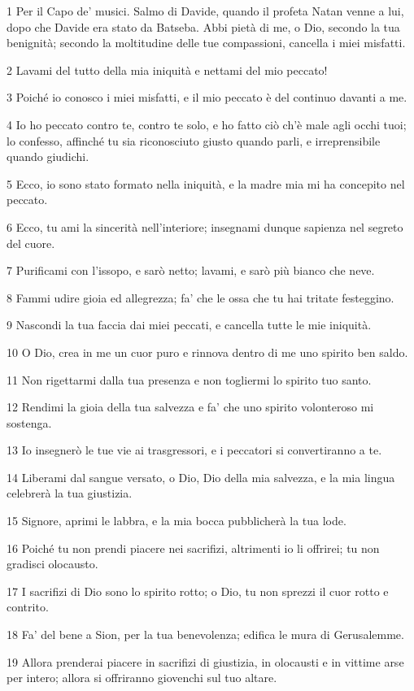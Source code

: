 \par 1 Per il Capo de' musici. Salmo di Davide, quando il profeta Natan venne a lui, dopo che Davide era stato da Batseba. Abbi pietà di me, o Dio, secondo la tua benignità; secondo la moltitudine delle tue compassioni, cancella i miei misfatti.
\par 2 Lavami del tutto della mia iniquità e nettami del mio peccato!
\par 3 Poiché io conosco i miei misfatti, e il mio peccato è del continuo davanti a me.
\par 4 Io ho peccato contro te, contro te solo, e ho fatto ciò ch'è male agli occhi tuoi; lo confesso, affinché tu sia riconosciuto giusto quando parli, e irreprensibile quando giudichi.
\par 5 Ecco, io sono stato formato nella iniquità, e la madre mia mi ha concepito nel peccato.
\par 6 Ecco, tu ami la sincerità nell'interiore; insegnami dunque sapienza nel segreto del cuore.
\par 7 Purificami con l'issopo, e sarò netto; lavami, e sarò più bianco che neve.
\par 8 Fammi udire gioia ed allegrezza; fa' che le ossa che tu hai tritate festeggino.
\par 9 Nascondi la tua faccia dai miei peccati, e cancella tutte le mie iniquità.
\par 10 O Dio, crea in me un cuor puro e rinnova dentro di me uno spirito ben saldo.
\par 11 Non rigettarmi dalla tua presenza e non togliermi lo spirito tuo santo.
\par 12 Rendimi la gioia della tua salvezza e fa' che uno spirito volonteroso mi sostenga.
\par 13 Io insegnerò le tue vie ai trasgressori, e i peccatori si convertiranno a te.
\par 14 Liberami dal sangue versato, o Dio, Dio della mia salvezza, e la mia lingua celebrerà la tua giustizia.
\par 15 Signore, aprimi le labbra, e la mia bocca pubblicherà la tua lode.
\par 16 Poiché tu non prendi piacere nei sacrifizi, altrimenti io li offrirei; tu non gradisci olocausto.
\par 17 I sacrifizi di Dio sono lo spirito rotto; o Dio, tu non sprezzi il cuor rotto e contrito.
\par 18 Fa' del bene a Sion, per la tua benevolenza; edifica le mura di Gerusalemme.
\par 19 Allora prenderai piacere in sacrifizi di giustizia, in olocausti e in vittime arse per intero; allora si offriranno giovenchi sul tuo altare.

